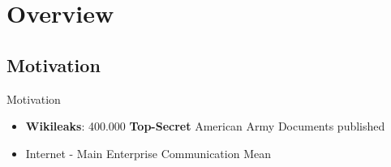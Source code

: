 \section{Overview}

\subsection{Motivation}
\begin{frame}{Motivation}
\begin{minipage}[t]{0.7\linewidth}

\begin{itemize}
\item \textbf{Wikileaks}:  400.000 \textbf{Top-Secret} American Army Documents published
\vspace{2 mm}
\item Internet - Main Enterprise Communication Mean
\end{itemize}
 

\end{minipage}
\end{frame}
